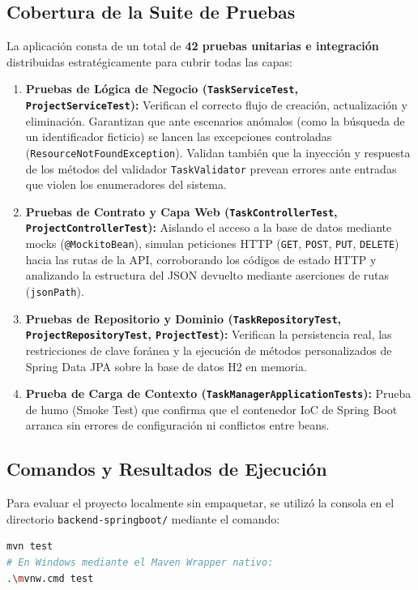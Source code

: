 \documentclass[12pt,a4paper]{article}
\begin{document}
\subsection{Cobertura de la Suite de Pruebas}
La aplicación consta de un total de \textbf{42 pruebas unitarias e integración} distribuidas estratégicamente para cubrir todas las capas:
\begin{enumerate}
    \item \textbf{Pruebas de Lógica de Negocio (\texttt{TaskServiceTest}, \texttt{ProjectServiceTest}):} Verifican el correcto flujo de creación, actualización y eliminación. Garantizan que ante escenarios anómalos (como la búsqueda de un identificador ficticio) se lancen las excepciones controladas (\texttt{ResourceNotFoundException}). Validan también que la inyección y respuesta de los métodos del validador \texttt{TaskValidator} prevean errores ante entradas que violen los enumeradores del sistema.
    \item \textbf{Pruebas de Contrato y Capa Web (\texttt{TaskControllerTest}, \texttt{ProjectControllerTest}):} Aislando el acceso a la base de datos mediante mocks (\texttt{@MockitoBean}), simulan peticiones HTTP (\texttt{GET}, \texttt{POST}, \texttt{PUT}, \texttt{DELETE}) hacia las rutas de la API, corroborando los códigos de estado HTTP y analizando la estructura del JSON devuelto mediante aserciones de rutas (\texttt{jsonPath}).
    \item \textbf{Pruebas de Repositorio y Dominio (\texttt{TaskRepositoryTest}, \texttt{ProjectRepositoryTest}, \texttt{ProjectTest}):} Verifican la persistencia real, las restricciones de clave foránea y la ejecución de métodos personalizados de Spring Data JPA sobre la base de datos H2 en memoria.
    \item \textbf{Prueba de Carga de Contexto (\texttt{TaskManagerApplicationTests}):} Prueba de humo (Smoke Test) que confirma que el contenedor IoC de Spring Boot arranca sin errores de configuración ni conflictos entre beans.
\end{enumerate}

\subsection{Comandos y Resultados de Ejecución}
Para evaluar el proyecto localmente sin empaquetar, se utilizó la consola en el directorio \texttt{backend-springboot/} mediante el comando:
\begin{lstlisting}[language=bash]
mvn test
# En Windows mediante el Maven Wrapper nativo:
.\mvnw.cmd test
\end{lstlisting}
\end{document}
